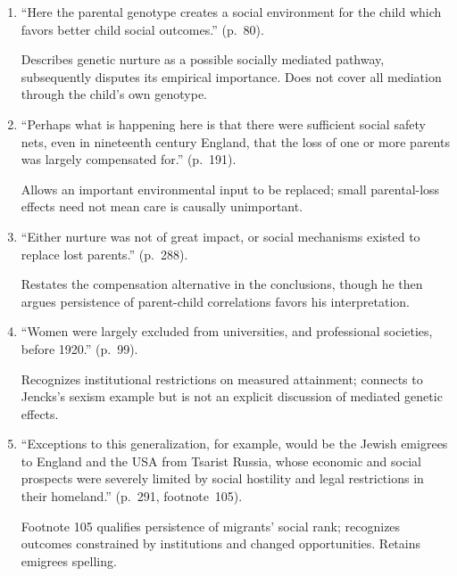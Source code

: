 \begin{enumerate}[label=\arabic*.]
\item ``Here the parental genotype creates a social environment for the child which favors better child social outcomes.'' (p.~80).

Describes genetic nurture as a possible socially mediated pathway, subsequently disputes its empirical importance. Does not cover all mediation through the child's own genotype.

\item ``Perhaps what is happening here is that there were sufficient social safety nets, even in nineteenth century England, that the loss of one or more parents was largely compensated for.'' (p.~191).

Allows an important environmental input to be replaced; small parental-loss effects need not mean care is causally unimportant.

\item ``Either nurture was not of great impact, or social mechanisms existed to replace lost parents.'' (p.~288).

Restates the compensation alternative in the conclusions, though he then argues persistence of parent-child correlations favors his interpretation.

\item ``Women were largely excluded from universities, and professional societies, before 1920.'' (p.~99).

Recognizes institutional restrictions on measured attainment; connects to Jencks's sexism example but is not an explicit discussion of mediated genetic effects.

\item ``Exceptions to this generalization, for example, would be the Jewish emigrees to England and the USA from Tsarist Russia, whose economic and social prospects were severely limited by social hostility and legal restrictions in their homeland.'' (p.~291, footnote~105).

Footnote 105 qualifies persistence of migrants' social rank; recognizes outcomes constrained by institutions and changed opportunities. Retains emigrees spelling.

\end{enumerate}
